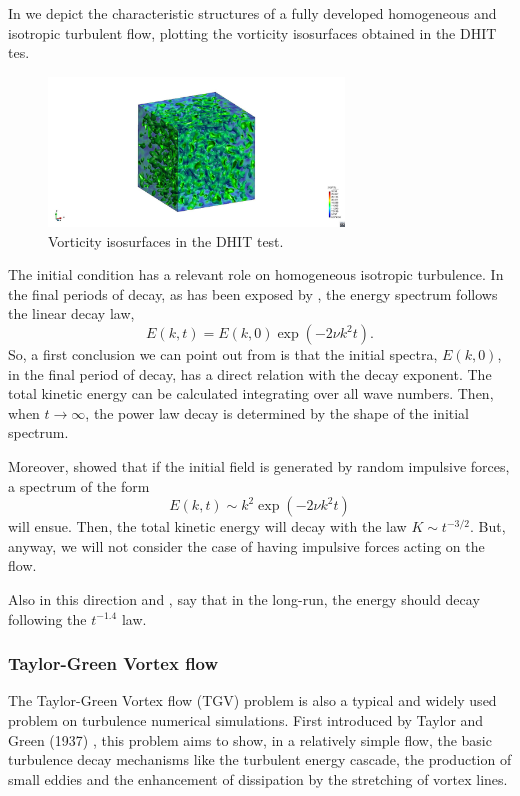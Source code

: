 In  we depict the characteristic structures of a fully developed homogeneous and isotropic turbulent flow, plotting the vorticity isosurfaces obtained in the DHIT tes.
\begin{figure}[h!]
	\centering	
	\includegraphics[trim=18cm 3.3cm 14cm 3.2cm,clip=true,width=0.7\textwidth]{Figures/Chapter3/DHIT_isovorticity}
	\caption{Vorticity isosurfaces in the DHIT test.}
	\label{fig-DHIT_isovorticity}
\end{figure}

The initial condition has a relevant role on homogeneous isotropic turbulence. In the final periods of decay, as has been exposed by \cite{hinze_turbulence_1975}, the energy spectrum follows the linear decay law,
\begin{equation}
\label{eq-DHIT_final_decay}
E(k,t)=E(k,0)\exp(-2\nu k^2t).
\end{equation}
So, a first conclusion we can point out from  is that the initial spectra, $E(k,0)$, in the final period of decay, has a direct relation with the decay exponent. The total kinetic energy can be calculated integrating  over all wave numbers. Then, when $t\rightarrow\infty$, the power law decay is determined by the shape of the initial spectrum.

Moreover, \cite{saffman_large-scale_1967} showed that if the initial field is generated by random impulsive forces, a spectrum of the form
\begin{equation}
\label{eq-DHIT_staffman_decay}
E(k,t)\sim k^2\exp(-2\nu k^2t)
\end{equation}
will ensue. Then, the total kinetic energy will decay with the law $K\sim t^{-3/2}$. But, anyway, we will not consider the case of having impulsive forces acting on the flow.

Also in this direction \cite{rohe_analysis_2010} and \cite{chalot1998consistent}, say that in the long-run, the energy should decay following the $t^{-1.4}$ law.

\subsubsection{Taylor-Green Vortex flow}
\label{subsubsec-C3_TGV}
The Taylor-Green Vortex flow (TGV) problem is also a typical and widely used problem on turbulence numerical simulations. First introduced by Taylor and Green (1937) \cite{taylor_mechanism_1937}, this problem aims to show, in a relatively simple flow, the basic turbulence decay mechanisms like the turbulent energy cascade, the production of small eddies and the enhancement of dissipation by the stretching of vortex lines.

